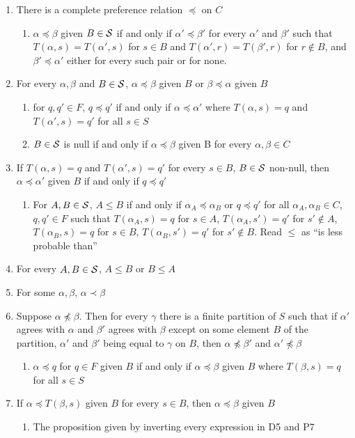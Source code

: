 \begin{enumerate}[P1:]
    \item There is a complete preference relation $\preceq$ on $C$
    \begin{enumerate}[D1:]
        \item $\alpha\preceq \beta$ given $B\in \mathcal{S}$ if and only if $\alpha'\preceq \beta'$ for every $\alpha'$ and $\beta'$ such that $T(\alpha,s)=T(\alpha',s)$ for $s\in B$ and $T(\alpha',r)=T(\beta',r)$ for $r\not\in B$, and $\beta'\preceq \alpha'$ either for every such pair or for none.
    \end{enumerate}
    \item For every $\alpha,\beta$ and $B\in \mathcal{S}$, $\alpha\preceq \beta$ given $B$ or $\beta\preceq \alpha$ given $B$
    \begin{enumerate}[D2:]
        \item for $q,q'\in F$, $q\preceq q'$ if and only if $\alpha\preceq \alpha'$ where $T(\alpha,s)=q$ and $T(\alpha',s)=q'$ for all $s\in S$
        \item $B\in \mathcal{S}$ is null if and only if $\alpha\preceq \beta$ given B for every $\alpha,\beta\in C$
    \end{enumerate}
    \item If $T(\alpha,s)=q$ and $T(\alpha',s)=q'$ for every $s\in B$, $B\in \mathcal{S}$ non-null, then $\alpha\preceq \alpha'$ given $B$ if and only if $q\preceq q'$
    \begin{enumerate}[D4:]
        \item For $A,B\in \mathcal{S}$, $A\leqslant B$ if and only if $\alpha_A\preceq \alpha_B$ or $q\preceq q'$ for all $\alpha_A,\alpha_B\in C$, $q,q'\in F$ such that $T(\alpha_A,s) = q$ for $s\in A$, $T(\alpha_A,s')=q'$ for $s'\not\in A$, $T(\alpha_B,s)=q$ for $s\in B$, $T(\alpha_B,s')=q'$ for $s'\not\in B$. Read $\leqslant$ as ``is less probable than''
    \end{enumerate}
    \item For every $A,B\in\mathcal{S}$, $A\leqslant B$ or $B\leqslant A$
    \item For some $\alpha,\beta$, $\alpha\prec \beta$
    \item Suppose $\alpha\not\preceq \beta$. Then for every $\gamma$ there is a finite partition of $S$ such that if $\alpha'$ agrees with $\alpha$ and $\beta'$ agrees with $\beta$ except on some element $B$ of the partition, $\alpha'$ and $\beta'$ being equal to $\gamma$ on $B$, then $\alpha\not\preceq \beta'$ and $\alpha'\not\preceq \beta$
    \begin{enumerate}[D5:]
        \item $\alpha\preceq q$ for $q\in F$ given $B$ if and only if $\alpha\preceq \beta$ given $B$ where $T(\beta,s)=q$ for all $s\in S$
    \end{enumerate}
    \item If $\alpha\preceq T(\beta,s)$ given $B$ for every $s\in B$, then $\alpha\preceq \beta$ given $B$
    \begin{enumerate}[P7':]
        \item The proposition given by inverting every expression in D5 and P7
    \end{enumerate}
\end{enumerate}

